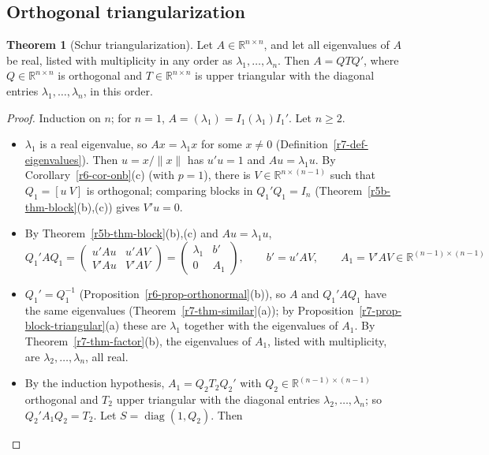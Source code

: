 \documentclass[12pt]{article}
\newcommand{\R}{\mathbb R}
\DeclareMathOperator{\diag}{diag}
\theoremstyle{definition}
\newtheorem{theorem}{Theorem}
\begin{document}
\subsection*{Orthogonal triangularization}

\begin{theorem}[Schur triangularization]\label{r7-thm-schur}
Let \(A\in\R^{n\times n}\), and let all eigenvalues of \(A\) be real, listed with multiplicity in any order as
\(\lambda_1,\dots,\lambda_n\). Then \(A=QTQ'\), where \(Q\in\R^{n\times n}\) is orthogonal and \(T\in\R^{n\times n}\) is
upper triangular with the diagonal entries \(\lambda_1,\dots,\lambda_n\), in this order.
\end{theorem}
\begin{proof}
Induction on \(n\); for \(n=1\), \(A=(\lambda_1)=I_1(\lambda_1)I_1'\). Let \(n\geqslant2\).
\begin{itemize}
\item \(\lambda_1\) is a real eigenvalue, so \(Ax=\lambda_1x\) for some \(x\ne0\) (Definition~\ref{r7-def-eigenvalues}).
Then \(u=x/\lVert x\rVert\) has \(u'u=1\) and \(Au=\lambda_1u\). By Corollary~\ref{r6-cor-onb}(c) (with \(p=1\)), there is
\(V\in\R^{n\times(n-1)}\) such that \(Q_1=[u\ V]\) is orthogonal; comparing blocks in \(Q_1'Q_1=I_n\)
(Theorem~\ref{r5b-thm-block}(b),(c)) gives \(V'u=0\).
\item By Theorem~\ref{r5b-thm-block}(b),(c) and \(Au=\lambda_1u\),
\[
Q_1'AQ_1=\begin{pmatrix}u'Au&u'AV\\V'Au&V'AV\end{pmatrix}=\begin{pmatrix}\lambda_1&b'\\0&A_1\end{pmatrix},\qquad
b'=u'AV,\qquad A_1=V'AV\in\R^{(n-1)\times(n-1)}
\]
\item \(Q_1'=Q_1^{-1}\) (Proposition~\ref{r6-prop-orthonormal}(b)), so \(A\) and \(Q_1'AQ_1\) have the same eigenvalues
(Theorem~\ref{r7-thm-similar}(a)); by Proposition~\ref{r7-prop-block-triangular}(a) these are \(\lambda_1\) together with
the eigenvalues of \(A_1\). By Theorem~\ref{r7-thm-factor}(b), the eigenvalues of \(A_1\), listed with multiplicity, are
\(\lambda_2,\dots,\lambda_n\), all real.
\item By the induction hypothesis, \(A_1=Q_2T_2Q_2'\) with \(Q_2\in\R^{(n-1)\times(n-1)}\) orthogonal and \(T_2\) upper
triangular with the diagonal entries \(\lambda_2,\dots,\lambda_n\); so \(Q_2'A_1Q_2=T_2\). Let \(S=\diag(1,Q_2)\). Then

\end{itemize}
\end{proof}
\end{document}
